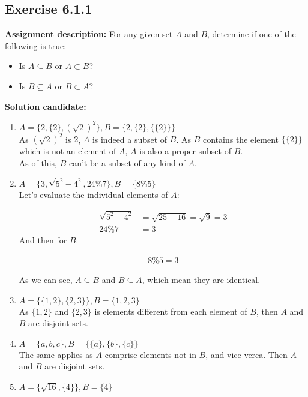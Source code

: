 \documentclass{report}
\newcommand{\mAlign}[1]{\begin{align*}#1\end{align*}}
\newcommand{\Assign}{\textbf{Assignment description: }}
\newcommand{\solution}{\textbf{Solution candidate: }}
\newcommand{\Exercise}[1]{\subsection{Exercise #1}}
\begin{document}
	\Exercise{6.1.1}
	
	\Assign
	For any given set $A$ and $B$, determine if one of the following is true:
	\begin{itemize}
		\item Is $A \subseteq B $ or $A \subset B$?
		\item Is $B \subseteq A$ or $B \subset A$?
	\end{itemize}

	\solution
	
	\begin{enumerate}[label = \textbf{a.}]
		\item $A = \{2,\{2\},(\sqrt{2})^2\}, B = \{2,\{2\},\{\{2\}\}\}$\\
		
		As $(\sqrt{2})^2$ is $2$, $A$ is indeed a subset of $B$. As $B$ contains the element $\{\{2\}\}$ which is not an element of $A$, $A$ is also a proper subset of $B$.\\
		
		As of this, $B$ can't be a subset of any kind of $A$.
		
		\item $A = \{3, \sqrt{5^2 - 4^2}, 24 \%  7\}, B = \{8 \% 5\}$\\
		
		Let's evaluate the individual elements of $A$:
		
		\mAlign{\sqrt{5^2 - 4^2} &= \sqrt{25 - 16} = \sqrt{9} = 3\\
						24\%7 &= 3}
		And then for $B$:
		
		\mAlign{8 \% 5 = 3}
		
		As we can see, $A\subseteq B$ and $B \subseteq A$, which mean they are identical.
		
		\item $A = \{\{1,2\},\{2,3\}\}, B = \{1,2,3\}$\\
		
		As $\{1,2\}$ and $\{2,3\}$ is elements different from each element of $B$, then $A$ and $B$ are disjoint sets.
		
		\item $A = \{a,b,c\}, B = \{\{a\},\{b\},\{c\}\}$\\
		
		The same applies as $A$ comprise elements not in $B$, and vice verca. Then $A$ and $B$ are disjoint sets.
		
		\item  $A = \{\sqrt{16},\{4\}\}, B = \{4\}$\\
		

\end{enumerate}
\end{document}
